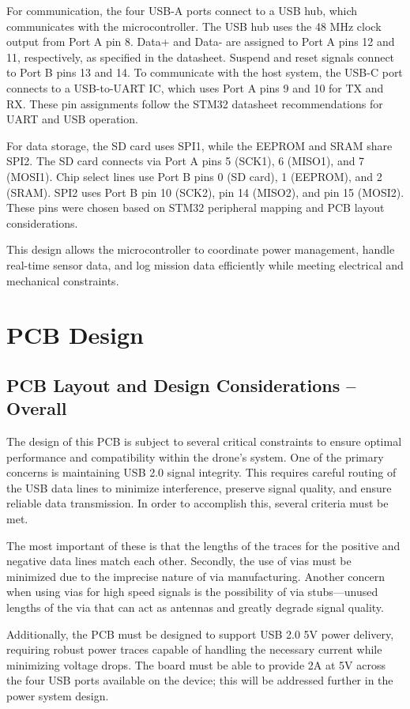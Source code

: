 \documentclass[12pt]{article}
\begin{document}
For communication, the four USB-A ports connect to a USB hub, which communicates with the microcontroller. The USB hub uses the 48 MHz clock output from Port A pin 8. Data+ and Data- are assigned to Port A pins 12 and 11, respectively, as specified in the datasheet. Suspend and reset signals connect to Port B pins 13 and 14. To communicate with the host system, the USB-C port connects to a USB-to-UART IC, which uses Port A pins 9 and 10 for TX and RX. These pin assignments follow the STM32 datasheet recommendations for UART and USB operation.

For data storage, the SD card uses SPI1, while the EEPROM and SRAM share SPI2. The SD card connects via Port A pins 5 (SCK1), 6 (MISO1), and 7 (MOSI1). Chip select lines use Port B pins 0 (SD card), 1 (EEPROM), and 2 (SRAM). SPI2 uses Port B pin 10 (SCK2), pin 14 (MISO2), and pin 15 (MOSI2). These pins were chosen based on STM32 peripheral mapping and PCB layout considerations.

This design allows the microcontroller to coordinate power management, handle real-time sensor data, and log mission data efficiently while meeting electrical and mechanical constraints.
\section{PCB Design}
\subsection{PCB Layout and Design Considerations – Overall}
The design of this PCB is subject to several critical constraints to ensure optimal performance and compatibility within the drone’s system. One of the primary concerns is maintaining USB 2.0 signal integrity. This requires careful routing of the USB data lines to minimize interference, preserve signal quality, and ensure reliable data transmission. In order to accomplish this, several criteria must be met. 

\par The most important of these is that the lengths of the traces for the positive and negative data lines match each other. Secondly, the use of vias must be minimized due to the imprecise nature of via manufacturing. Another concern when using vias for high speed signals is the possibility of via stubs—unused lengths of the via that can act as antennas and greatly degrade signal quality.

\par Additionally, the PCB must be designed to support USB 2.0 5V power delivery, requiring robust power traces capable of handling the necessary current while minimizing voltage drops. The board must be able to provide 2A at 5V across the four USB ports available on the device; this will be addressed further in the power system design.
\end{document}
